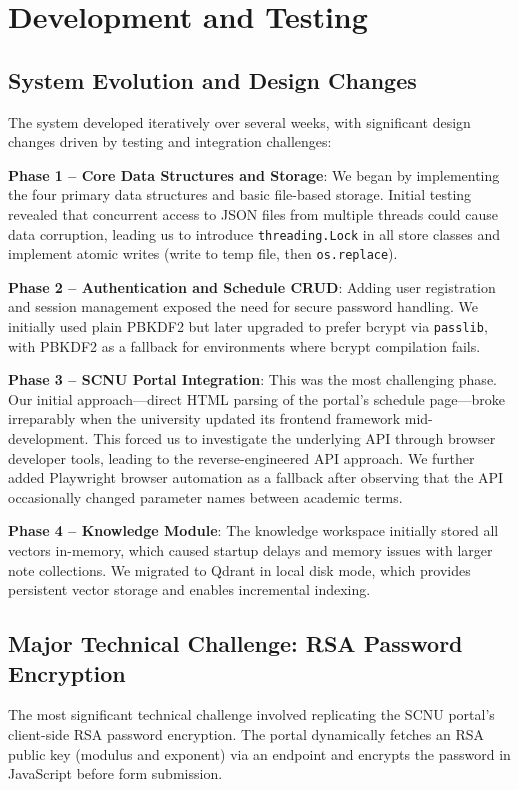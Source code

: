 \documentclass[11pt,a4paper]{article}
\begin{document}
\section{Development and Testing}

\subsection{System Evolution and Design Changes}
The system developed iteratively over several weeks, with significant design changes driven by testing and integration challenges:

\textbf{Phase 1 -- Core Data Structures and Storage}: We began by implementing the four primary data structures and basic file-based storage. Initial testing revealed that concurrent access to JSON files from multiple threads could cause data corruption, leading us to introduce \texttt{threading.Lock} in all store classes and implement atomic writes (write to temp file, then \texttt{os.replace}).

\textbf{Phase 2 -- Authentication and Schedule CRUD}: Adding user registration and session management exposed the need for secure password handling. We initially used plain PBKDF2 but later upgraded to prefer bcrypt via \texttt{passlib}, with PBKDF2 as a fallback for environments where bcrypt compilation fails.

\textbf{Phase 3 -- SCNU Portal Integration}: This was the most challenging phase. Our initial approach---direct HTML parsing of the portal's schedule page---broke irreparably when the university updated its frontend framework mid-development. This forced us to investigate the underlying API through browser developer tools, leading to the reverse-engineered API approach. We further added Playwright browser automation as a fallback after observing that the API occasionally changed parameter names between academic terms.

\textbf{Phase 4 -- Knowledge Module}: The knowledge workspace initially stored all vectors in-memory, which caused startup delays and memory issues with larger note collections. We migrated to Qdrant in local disk mode, which provides persistent vector storage and enables incremental indexing.

\subsection{Major Technical Challenge: RSA Password Encryption}
The most significant technical challenge involved replicating the SCNU portal's client-side RSA password encryption. The portal dynamically fetches an RSA public key (modulus and exponent) via an endpoint and encrypts the password in JavaScript before form submission.
\end{document}
